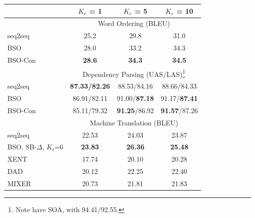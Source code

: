 \documentclass{beamer}
\begin{document}
\begin{frame}
  \vspace{-0.2cm}
  \begin{table}
  \centering
    \small
  \begin{tabular}{lccc}
    \toprule
    & $K_e$ = 1 & $K_e$ = 5 & $K_e$ = 10 \\ 
    \midrule
     & \multicolumn{3}{c}{Word Ordering (BLEU) } \\ 
    \midrule
    seq2seq & 25.2 & 29.8 & 31.0 \\
    BSO     & 28.0 & 33.2 & 34.3 \\
    BSO-Con & \textbf{28.6} & \textbf{34.3} & \textbf{34.5} \\
    \midrule


    & \multicolumn{3}{c}{Dependency Parsing (UAS/LAS)\footnote{Note \citet{Andor2016} have SOA, with 94.41/92.55.} } \\ 
    seq2seq & \textbf{87.33/82.26} & 88.53/84.16 & 88.66/84.33\\
    BSO & 86.91/82.11 & 91.00/\textbf{87.18} & 91.17/\textbf{87.41} \\
    BSO-Con & 85.11/79.32 & \textbf{91.25}/86.92 & \textbf{91.57}/87.26 \\

    \midrule
    & \multicolumn{3}{c}{Machine Translation (BLEU) } \\ 
    seq2seq & 22.53 & 24.03 & 23.87 \\
    BSO, SB-$\Delta$, $K_t$=6 & \textbf{23.83} & \textbf{26.36} & \textbf{25.48} \\
    XENT & 17.74 & 20.10 & 20.28 \\
    DAD & 20.12 & 22.25 & 22.40 \\ 
    MIXER & 20.73 & 21.81 & 21.83 \\    
    \bottomrule
  \end{tabular}
  \label{tab:mtfinal}
\end{table}

\end{frame}
\end{document}
